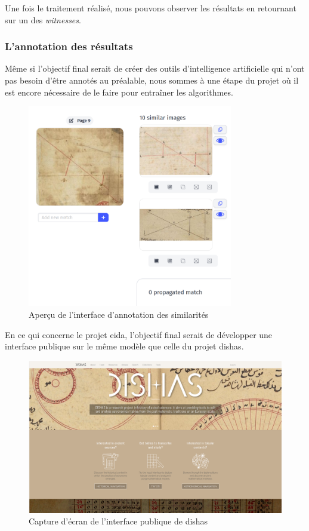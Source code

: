 Une fois le traitement réalisé, nous pouvons observer les résultats en retournant sur un des \textit{witnesses}. 

\subsubsection{L'annotation des résultats}


Même si l'objectif final serait de créer des outils d'intelligence artificielle qui n'ont pas besoin d'être annotés au préalable, nous sommes à une étape du projet où il est encore nécessaire de le faire pour entraîner les algorithmes.

\begin{figure}[H]
	\centering
	\includegraphics[width=0.8\textwidth]{images/annotation_similarities.png}
	\caption{Aperçu de l'interface d'annotation des similarités}
	\label{fig:annotations_similarites}
\end{figure}



En ce qui concerne le projet \gls{eida}, l'objectif final serait de développer une interface publique sur le même modèle que celle du projet \gls{dishas}.

\begin{figure}[H]
	\centering
	\includegraphics[width=1\textwidth]{images/dishas.png}
	\caption{Capture d'écran de l'interface publique de \gls{dishas}}
	\label{fig:dishas-interface}
\end{figure}

